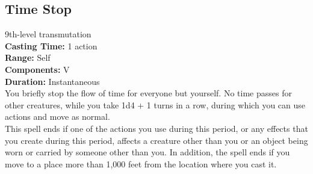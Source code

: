 \documentclass[11pt, A4paper, english]{article}
\begin{document}
		\subsection{Time Stop}
9th-level transmutation \\
\textbf{Casting Time:} 1 action \\
\textbf{Range:} Self \\
\textbf{Components:} V \\
\textbf{Duration:} Instantaneous \\
You briefly stop the flow of time for everyone but yourself. No time passes for other creatures, while you take 1d4 + 1 turns in a row, during which you can use actions and move as normal. \\
This spell ends if one of the actions you use during this period, or any effects that you create during this period, affects a creature other than you or an object being worn or carried by someone other than you. In addition, the spell ends if you move to a place more than 1,000 feet from the location where you cast it.
\end{document}
